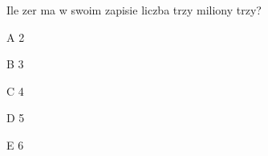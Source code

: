 \begin{tresc}
Ile zer ma w swoim zapisie liczba trzy miliony trzy?
\end{tresc}
\begin{wariant}{A} 2 \end{wariant}
\begin{wariant}{B} 3 \end{wariant}
\begin{wariant}{C} 4 \end{wariant}
\begin{wariant}{D} 5 \end{wariant}
\begin{wariant}{E} 6 \end{wariant}
